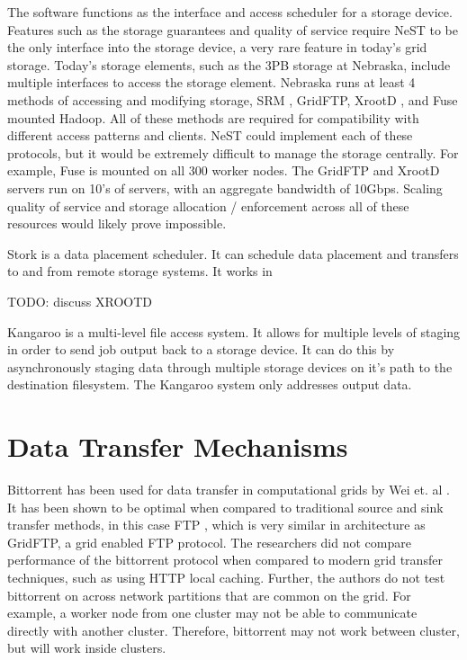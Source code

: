 The software functions as the interface and access scheduler for a storage device.  Features such as the storage guarantees and quality of service require NeST to be the only interface into the storage device, a very rare feature in today's grid storage.  Today's storage elements, such as the 3PB storage at Nebraska, include multiple interfaces to access the storage element.  Nebraska runs at least 4 \cite{attebury2009hadoop} methods of accessing and modifying storage, SRM \cite{shoshani2002storage}, GridFTP, XrootD \cite{dorigo2005xrootd}, and Fuse \cite{szeredi2010fuse} mounted Hadoop.  All of these methods are required for compatibility with different access patterns and clients.  NeST could implement each of these protocols, but it would be extremely difficult to manage the storage centrally.  For example, Fuse is mounted on all 300 worker nodes.  The GridFTP and XrootD servers run on 10's of servers, with an aggregate bandwidth of 10Gbps.  Scaling quality of service and storage allocation / enforcement across all of these resources would likely prove impossible.

Stork \cite{kosar2004stork} is a data placement scheduler.  It can schedule data placement and transfers to and from remote storage systems.  It works in


TODO: discuss XROOTD

Kangaroo \cite{thain2001kangaroo} is a multi-level file access system.  It allows for multiple levels of staging in order to send job output back to a storage device.  It can do this by asynchronously staging data through multiple storage devices on it's path to the destination filesystem.  The Kangaroo system only addresses output data.

\section{Data Transfer Mechanisms}

Bittorrent has been used for data transfer in computational grids by Wei et. al \cite{wei2005collaborative, wei2005scheduling, wei2007towards}.  It has been shown to be optimal when compared to traditional source and sink transfer methods, in this case FTP \cite{postel1985file}, which is very similar in architecture as GridFTP, a grid enabled FTP protocol.  The researchers did not compare performance of the bittorrent protocol when compared to modern grid transfer techniques, such as using HTTP local caching.  Further, the authors do not test bittorrent on across network partitions that are common on the grid.  For example, a worker node from one cluster may not be able to communicate directly with another cluster.  Therefore, bittorrent may not work between cluster, but will work inside clusters.

